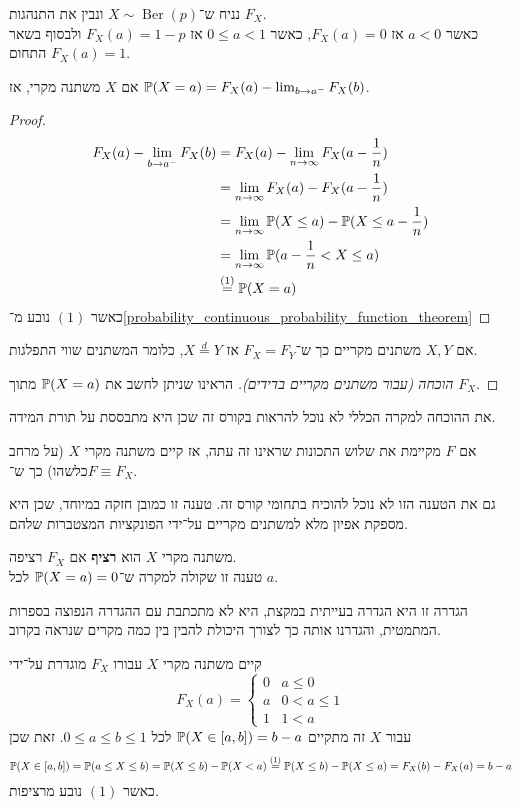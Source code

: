 \begin{example}
	נניח ש־$X \sim \operatorname{Ber}(p)$ ונבין את התנהגות $F_X$. \\
	כאשר $a < 0$ אז $F_X(a) = 0$, כאשר $0 \le a < 1$ אז $F_X(a) = 1 - p$ ולבסוף בשאר התחום $F_X(a) = 1$.
\end{example}
\begin{proposition}
	אם $X$ משתנה מקרי, אז $\mathbb{P}(X = a) = F_X(a) - \lim_{b \to a^-} F_X(b)$.
\end{proposition}
\begin{proof}
	\begin{align*}
		F_X(a) - \lim_{b \to a^-} F_X(b)
		& = F_X(a) - \lim_{n \to \infty} F_X(a - \frac{1}{n}) \\
		& = \lim_{n \to \infty} F_X(a) - F_X(a - \frac{1}{n}) \\
		& = \lim_{n \to \infty} \mathbb{P}(X \le a) - \mathbb{P}(X \le a - \frac{1}{n}) \\
		& = \lim_{n \to \infty} \mathbb{P}(a - \frac{1}{n} < X \le a) \\
		& \overset{(1)}{=} \mathbb{P}(X = a)
	\end{align*}
	כאשר $(1)$ נובע מ־\ref{probability_continuous_probability_function_theorem}
\end{proof}
\begin{proposition}
	אם $X, Y$ משתנים מקריים כך ש־$F_X = F_Y$ אז $X \overset{d}{=} Y$, כלומר המשתנים שווי התפלגות.
\end{proposition}
\begin{proof}[הוכחה (עבור משתנים מקריים בדידים)]
	הראינו שניתן לחשב את $\mathbb{P}(X = a)$ מתוך $F_X$.
\end{proof}
את ההוכחה למקרה הכללי לא נוכל להראות בקורס זה שכן היא מתבססת על תורת המידה.
\begin{proposition}
	אם $F$ מקיימת את שלוש התכונות שראינו זה עתה, אז קיים משתנה מקרי $X$ (על מרחב כלשהו) כך ש־$F \equiv F_X$.
\end{proposition}
גם את הטענה הזו לא נוכל להוכיח בתחומי קורס זה.
טענה זו כמובן חזקה במיוחד, שכן היא מספקת אפיון מלא למשתנים מקריים על־ידי הפונקציות המצטברות שלהם.
\begin{definition}
	משתנה מקרי $X$ הוא \textbf{רציף} אם $F_X$ רציפה. \\
	טענה זו שקולה למקרה ש־$\mathbb{P}(X = a) = 0$ לכל $a$.
\end{definition}
הגדרה זו היא הגדרה בעייתית במקצת, היא לא מתכתבת עם ההגדרה הנפוצה בספרות המתמטית, והגדרנו אותה כך לצורך היכולת להבין בין כמה מקרים שנראה בקרוב.
\begin{example}
	קיים משתנה מקרי $X$ עבורו $F_X$ מוגדרת על־ידי
	\[
		F_X(a) = \begin{cases}
			0 & a \le 0 \\
			a & 0 < a \le 1 \\
			1 & 1 < a
		\end{cases}
	\]
	עבור $X$ זה מתקיים $\mathbb{P}(X \in [a, b]) = b - a$ לכל $0 \le a \le b \le 1$.
	זאת שכן
	\[
		\mathbb{P}(X \in [a, b])
		= \mathbb{P}(a \le X \le b)
		= \mathbb{P}(X \le b) - \mathbb{P}(X < a)
		\overset{(1)}{=} \mathbb{P}(X \le b) - \mathbb{P}(X \le a)
		= F_X(b) - F_X(a)
		= b - a
	\]
	כאשר $(1)$ נובע מרציפות.
\end{example}

